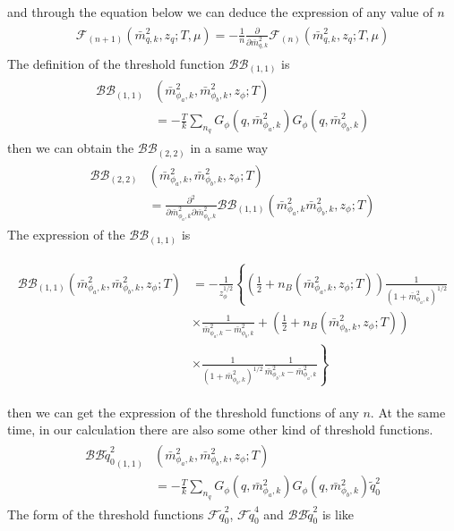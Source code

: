 \documentclass[%
reprint,
superscriptaddress,
showpacs,preprintnumbers,
 amsmath,amssymb,
 aps,
prd,
]{revtex4-1}
\begin{document}
and through the equation below we can deduce the expression of any value of $n$
\begin{align}
\begin{split}
\mathcal{F}_{(n+1)}(\bar{m}^{2}_{q,k},z_q;T,\mu)=-\frac{1}{n}\frac{\partial}{\partial\bar{m}^{2}_{q,k}}\mathcal{F}_{(n)}
(\bar{m}^{2}_{q,k},z_q;T,\mu)
\end{split}
\end{align} 
The definition of the threshold function $\mathcal{BB}_{(1,1)}$ is
\begin{align}
\begin{split}
\mathcal{BB}_{(1,1)}&(\bar{m}^{2}_{\phi_a,k},\bar{m}^{2}_{\phi_b,k},z_\phi;T)\\
&=-\frac{T}{k}\sum_{n_q}G_\phi(q,\bar{m}^{2}_{\phi_a,k})G_\phi(q,\bar{m}^{2}_{\phi_b,k})
\end{split}
\end{align} 
then we can obtain the $\mathcal{BB}_{(2,2)}$ in a same way
\begin{align}
\begin{split}
\mathcal{BB}_{(2,2)}&(\bar{m}^{2}_{\phi_a,k},\bar{m}^{2}_{\phi_b,k},z_\phi;T)\\
&=\frac{\partial^2}{\partial\bar{m}^{2}_{\phi_a,k}\partial\bar{m}^{2}_{\phi_b,k}}\mathcal{BB}_{(1,1)}(\bar{m}^{2}_{\phi_a,k}
\bar{m}^{2}_{\phi_b,k},z_\phi;T)
\end{split}
\end{align} 
The expression of the $\mathcal{BB}_{(1,1)}$ is 
\begin{widetext}
\begin{align}
\begin{split}
\mathcal{BB}_{(1,1)}(\bar{m}^{2}_{\phi_a,k},\bar{m}^{2}_{\phi_b,k},z_\phi;T)&=-\frac{1}{z^{1/2}_{\phi}}\left\{ \left( 
\frac{1}{2}+n_B(\bar{m}^{2}_{\phi_a,k},z_\phi;T) \right)\frac{1}{(1+\bar{m}^{2}_{\phi_a,k})^{1/2}} \right. \\
&\left.\times \frac{1}{\bar{m}^{2}_{\phi_a,k}-\bar{m}^{2}_{\phi_b,k}}+\left( \frac{1}{2}+n_B(\bar{m}^{2}_{\phi_b,k},z_\phi;T) 
\right)\right. \\
&\left.\times \frac{1}{(1+\bar{m}^{2}_{\phi_b,k})^{1/2}}\frac{1}{\bar{m}^{2}_{\phi_b,k}-\bar{m}^{2}_{\phi_a,k}}\right\}
\end{split}
\end{align} 
\end{widetext}
then we can get the expression of the threshold functions of any $n$.
At the same time, in our calculation there are also some other kind of threshold functions.
\begin{align}
\begin{split}
{\mathcal{BB}\tilde{q}_0^2}_{(1,1)}&(\bar{m}^{2}_{\phi_a,k},\bar{m}^{2}_{\phi_b,k},z_\phi;T)\\
&=-\frac{T}{k}\sum_{n_q}G_\phi(q,\bar{m}^{2}_{\phi_a,k})G_\phi(q,\bar{m}^{2}_{\phi_b,k})\tilde{q}_0^2
\end{split}
\end{align}
 The form of the threshold functions 
$\mathcal{F}\tilde{q}_0^2$,  $\mathcal{F}\tilde{q}_0^4$ and $\mathcal{BB}\tilde{q}_0^2$ is like
\end{document}
